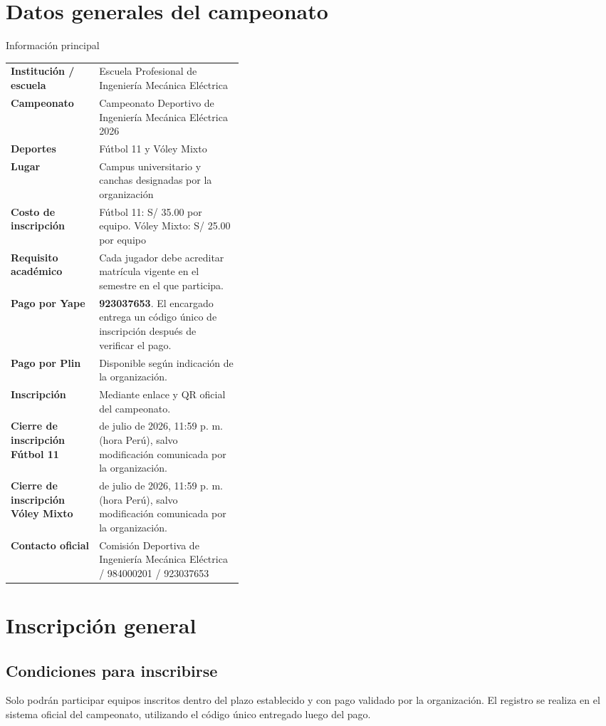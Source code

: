 \documentclass[12pt,a4paper]{article}
\newcommand{\numeroYape}{923037653}
\newcommand{\numeroContacto}{984000201 / 923037653}
\newcommand{\nombreCampeonato}{Campeonato Deportivo de Ingeniería Mecánica Eléctrica 2026}
\newcommand{\organizador}{Comisión Deportiva de Ingeniería Mecánica Eléctrica}
\newcommand{\fechaCierreInscripcion}{8 de julio de 2026, 11:59 p. m. (hora Perú)}
\newcommand{\datoTabla}[2]{%
	\textbf{\textcolor{imegreenDark}{#1}} & #2\\[0.35em]
}
\begin{document}
	\section{Datos generales del campeonato}
	
	\begin{cajaResumen}{Información principal}
		\renewcommand{\arraystretch}{1.25}
		\begin{tabularx}{\linewidth}{
				>{\RaggedRight\arraybackslash}p{0.38\linewidth}
				>{\RaggedRight\arraybackslash}X
			}
			\datoTabla{Institución / escuela}{Escuela Profesional de Ingeniería Mecánica Eléctrica}
			\datoTabla{Campeonato}{\nombreCampeonato}
			\datoTabla{Deportes}{Fútbol 11 y Vóley Mixto}
			\datoTabla{Lugar}{Campus universitario y canchas designadas por la organización}
			\datoTabla{Costo de inscripción}{Fútbol 11: S/ 35.00 por equipo. Vóley Mixto: S/ 25.00 por equipo}
			\datoTabla{Requisito académico}{Cada jugador debe acreditar matrícula vigente en el semestre en el que participa.}
			\datoTabla{Pago por Yape}{\textbf{\numeroYape}. El encargado entrega un código único de inscripción después de verificar el pago.}
			\datoTabla{Pago por Plin}{Disponible según indicación de la organización.}
			\datoTabla{Inscripción}{Mediante enlace y QR oficial del campeonato.}
			\datoTabla{Cierre de inscripción Fútbol 11}{\fechaCierreInscripcion, salvo modificación comunicada por la organización.}
			\datoTabla{Cierre de inscripción Vóley Mixto}{\fechaCierreInscripcion, salvo modificación comunicada por la organización.}
			\datoTabla{Contacto oficial}{\organizador{} / \numeroContacto}
		\end{tabularx}
	\end{cajaResumen}
	
	\section{Inscripción general}
	
	\subsection{Condiciones para inscribirse}
	
	Solo podrán participar equipos inscritos dentro del plazo establecido y con pago validado por la organización. El registro se realiza en el sistema oficial del campeonato, utilizando el código único entregado luego del pago.
	
\end{document}
